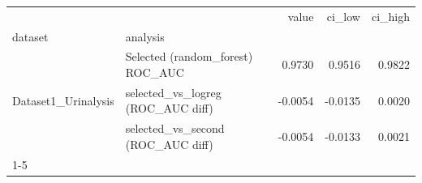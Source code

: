 \begin{tabular}{llrrr}
\toprule
 &  & value & ci_low & ci_high \\
dataset & analysis &  &  &  \\
\midrule
\multirow[t]{3}{*}{Dataset1_Urinalysis} & Selected (random_forest) ROC_AUC & 0.9730 & 0.9516 & 0.9822 \\
 & selected_vs_logreg (ROC_AUC diff) & -0.0054 & -0.0135 & 0.0020 \\
 & selected_vs_second (ROC_AUC diff) & -0.0054 & -0.0133 & 0.0021 \\
\cline{1-5}
\bottomrule
\end{tabular}
